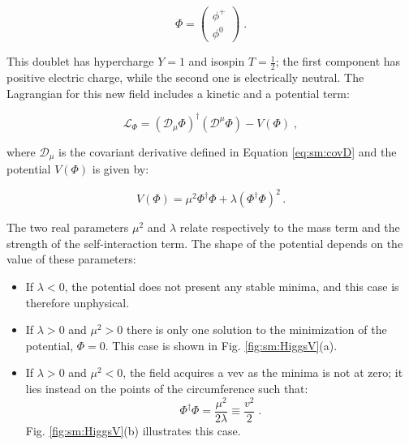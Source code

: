 \begin{equation}
	\Phi = \left( \begin{array}{c} \phi^+  \\ \phi^0 \end{array} \right) \; .
\end{equation}

\noindent This doublet has hypercharge $Y=1$ and isospin $T=\frac{1}{2}$; the first component has positive electric charge, while the second one is electrically neutral. The Lagrangian for this new field includes a kinetic and a potential term:

\begin{equation}
	\mathcal{L}_{\Phi} = ( \mathcal{D}_{\mu} \Phi)^{\dagger} (\mathcal{D}^{\mu} \Phi) - V(\Phi) \; ,
	\label{eq:LHiggs}
\end{equation}

\noindent where $\mathcal{D}_{\mu}$ is the covariant derivative defined in Equation \ref{eq:sm:covD} and the potential $V(\Phi)$ is given by:

\begin{equation}
 V(\Phi) =  \mu^2 \Phi^{\dagger} \Phi + \lambda (\Phi^{\dagger} \Phi)^2 \, . 
	\label{eq:hpot}
\end{equation}

\noindent The two real parameters $\mu^2$ and $\lambda$ relate respectively to the mass term and the strength of the self-interaction term. The shape of the potential depends on the value of these parameters:
\begin{itemize}
\item If $\lambda < 0$, the potential does not present any stable minima, and this case is therefore unphysical.
\item If $\lambda > 0$ and $\mu^2 > 0$ there is only one solution to the minimization of the potential, $\Phi=0$. This case is shown in Fig. \ref{fig:sm:HiggsV}(a).
\item If $\lambda > 0$ and $\mu^2 < 0$, the field acquires a \gls{vev} as the minima is not at zero; it lies instead on the points of the circumference such that:
\begin{equation}
\Phi^{\dagger} \Phi = \frac{\mu^2}{2 \lambda}  \equiv \frac{v^2}{2} \; .
\end{equation}
\noindent Fig. \ref{fig:sm:HiggsV}(b) illustrates this case.
\end{itemize}


